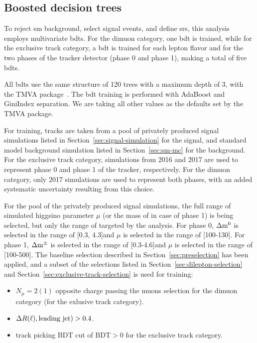 \subsection{Boosted decision trees}
\label{sec:event-bdt}

To reject \gls{sm} background, select signal events, and define  \glspl{sr}, this analysis employs multivariate \glspl{bdt}. For the dimuon category, one \gls{bdt} is trained, while for the exclusive track category, a \gls{bdt} is trained for each lepton flavor and for the two phases of the tracker detector (phase 0 and phase 1), making a total of five \glspl{bdt}.

All \glspl{bdt} use the same structure of 120 trees with a maximum depth of 3, with the TMVA package~\cite{tmva}. The \gls{bdt} training is performed with AdaBoost and GiniIndex separation. We are taking all other values as the defaults set by the TMVA package. 

For training, tracks are taken from a pool of privately produced \FASTSIM signal simulations listed in Section~\ref{sec:signal-simulation} for the signal, and standard model background simulation listed in Section~\ref{sec:sm-mc} for the background. For the exclusive track category, simulations from 2016 and 2017 are used to represent phase 0 and phase 1 of the tracker, respectively. For the dimuon category, only 2017 simulations are used to represent both phases, with an added systematic uncertainty resulting from this choice.

For the pool of the privately produced \FASTSIM signal simulations, the full range of simulated higgsino parameter $\mu$ (or the mass of \PSGcpmDo in case of phase 1) is being selected, but only the range of \dm targeted by the analysis. For phase 0, $\Delta\mathrm{m}^0$ is selected in the range of [0.3, 4.3]\GeV and $\mu$ is selected in the range of [100-130]\GeV. For phase 1, $\Delta\mathrm{m}^\pm$ is selected in the range of [0.3-4.6]\GeV and $\mu$ is selected in the range of [100-500]\GeV. The baseline selection described in Section~\ref{sec:preselection} has been applied, and a subset of the selections listed in Section~\ref{sec:dilepton-selection} and Section~\ref{sec:exclusive-track-selection} is used for training:

\begin{itemize}

\item $N_\mu = 2 (1)$ opposite charge passing the muons selection for the dimuon category (for the exlusive track category).

\item $\Delta R(\ell),\text{leading jet}) > 0.4$. 

\item track picking BDT cut of $\mathrm{BDT} > 0$ for the exclusive track category.

\end{itemize}

